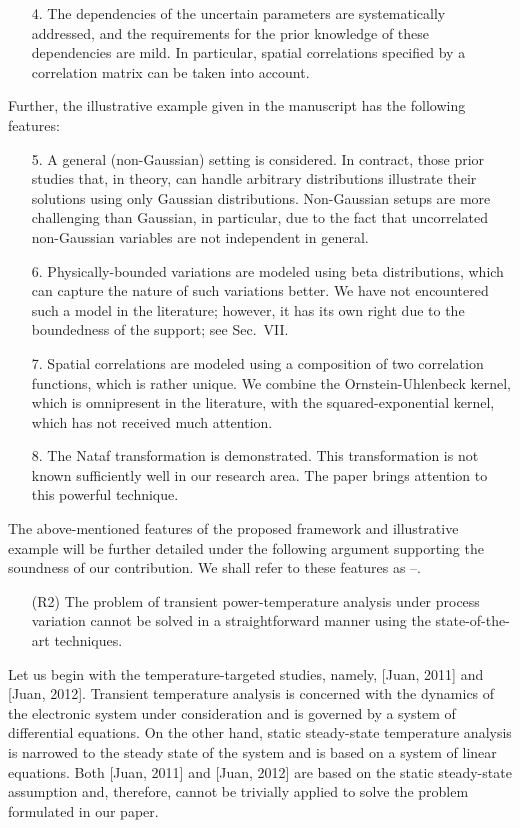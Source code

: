 \begin{authors}
\begin{itemize}
  \item[4.] The dependencies of the uncertain parameters are systematically addressed, and the requirements for the prior knowledge of these dependencies are mild.
  In particular, spatial correlations specified by a correlation matrix can be taken into account.
\end{itemize}

Further, the illustrative example given in the manuscript has the following features:
\begin{itemize}
  \item[5.] A general (non-Gaussian) setting is considered.
  In contract, those prior studies that, in theory, can handle arbitrary distributions illustrate their solutions using only Gaussian distributions.
  Non-Gaussian setups are more challenging than Gaussian, in particular, due to the fact that uncorrelated non-Gaussian variables are not independent in general.

  \item[6.] Physically-bounded variations are modeled using beta distributions, which can capture the nature of such variations better.
  We have not encountered such a model in the literature; however, it has its own right due to the boundedness of the support; see Sec.~VII.

  \item[7.] Spatial correlations are modeled using a composition of two correlation functions, which is rather unique.
  We combine the Ornstein-Uhlenbeck kernel, which is omnipresent in the literature, with the squared-exponential kernel, which has not received much attention.

  \item[8.] The Nataf transformation is demonstrated.
  This transformation is not known sufficiently well in our research area.
  The paper brings attention to this powerful technique.
\end{itemize}

The above-mentioned features of the proposed framework and illustrative example will be further detailed under the following argument supporting the soundness of our contribution.
We shall refer to these features as --.

\begin{itemize}
  \item[(R2)] The problem of transient power-temperature analysis under process variation cannot be solved in a straightforward manner using the state-of-the-art techniques.
\end{itemize}
Let us begin with the temperature-targeted studies, namely, [Juan, 2011] and [Juan, 2012].
Transient temperature analysis is concerned with the dynamics of the electronic system under consideration and is governed by a system of differential equations.
On the other hand, static steady-state temperature analysis is narrowed to the steady state of the system and is based on a system of linear equations.
Both [Juan, 2011] and [Juan, 2012] are based on the static steady-state assumption and, therefore, cannot be trivially applied to solve the problem formulated in our paper.


\end{authors}
